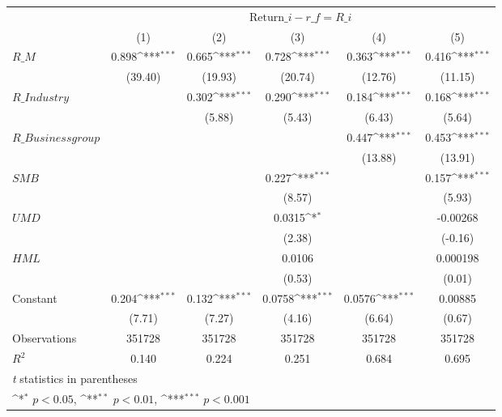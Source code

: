 {
\def\sym#1{\ifmmode^{#1}\else\(^{#1}\)\fi}
\begin{tabular}{l*{5}{c}}
\hline\hline
                &\multicolumn{5}{c}{ $ \text{Return}\_i - r\_f = R\_i$ }                                          \\\cmidrule(lr){2-6}
                &\multicolumn{1}{c}{(1)}         &\multicolumn{1}{c}{(2)}         &\multicolumn{1}{c}{(3)}         &\multicolumn{1}{c}{(4)}         &\multicolumn{1}{c}{(5)}         \\
\hline
 $ R\_M $        &    0.898\sym{***}&    0.665\sym{***}&    0.728\sym{***}&    0.363\sym{***}&    0.416\sym{***}\\
                &  (39.40)         &  (19.93)         &  (20.74)         &  (12.76)         &  (11.15)         \\
[1em]
 $ R\_{Industry} $ &                  &    0.302\sym{***}&    0.290\sym{***}&    0.184\sym{***}&    0.168\sym{***}\\
                &                  &   (5.88)         &   (5.43)         &   (6.43)         &   (5.64)         \\
[1em]
 $ R\_{Business group} $ &                  &                  &                  &    0.447\sym{***}&    0.453\sym{***}\\
                &                  &                  &                  &  (13.88)         &  (13.91)         \\
[1em]
 $ SMB $        &                  &                  &    0.227\sym{***}&                  &    0.157\sym{***}\\
                &                  &                  &   (8.57)         &                  &   (5.93)         \\
[1em]
 $ UMD $        &                  &                  &   0.0315\sym{*}  &                  & -0.00268         \\
                &                  &                  &   (2.38)         &                  &  (-0.16)         \\
[1em]
 $ HML $        &                  &                  &   0.0106         &                  & 0.000198         \\
                &                  &                  &   (0.53)         &                  &   (0.01)         \\
[1em]
Constant        &    0.204\sym{***}&    0.132\sym{***}&   0.0758\sym{***}&   0.0576\sym{***}&  0.00885         \\
                &   (7.71)         &   (7.27)         &   (4.16)         &   (6.64)         &   (0.67)         \\
\hline
Observations    &   351728         &   351728         &   351728         &   351728         &   351728         \\
\(R^{2}\)       &    0.140         &    0.224         &    0.251         &    0.684         &    0.695         \\
\hline\hline
\multicolumn{6}{l}{\footnotesize \textit{t} statistics in parentheses}\\
\multicolumn{6}{l}{\footnotesize \sym{*} \(p<0.05\), \sym{**} \(p<0.01\), \sym{***} \(p<0.001\)}\\
\end{tabular}
}
